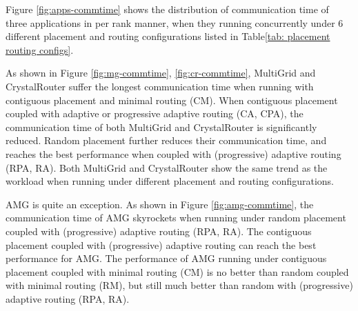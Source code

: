 \documentclass[conference,compsoc]{IEEEtran}
\begin{document}
Figure \ref{fig:apps-commtime} shows the distribution of communication time of three applications in per rank manner, when they running concurrently under 6 different placement and routing configurations listed in Table\ref{tab: placement routing configs}.

As shown in Figure \ref{fig:mg-commtime}, \ref{fig:cr-commtime}, MultiGrid and CrystalRouter suffer the longest communication time when running with contiguous placement and minimal routing (CM). When contiguous placement coupled with adaptive or progressive adaptive routing (CA, CPA), the communication time of both MultiGrid and CrystalRouter is significantly reduced. Random placement further reduces their communication time, and reaches the best performance when coupled with (progressive) adaptive routing (RPA, RA). Both MultiGrid and CrystalRouter show the same trend as the workload when running under different placement and routing configurations. 

AMG is quite an exception. As shown in Figure \ref{fig:amg-commtime}, the communication time of AMG skyrockets when running under random placement coupled with (progressive) adaptive routing (RPA, RA). The contiguous placement coupled with (progressive) adaptive routing can reach the best performance for AMG. The performance of AMG running under contiguous placement coupled with minimal routing (CM) is no better than random coupled with minimal routing (RM), but still much better than random with (progressive) adaptive routing (RPA, RA). 
\end{document}
